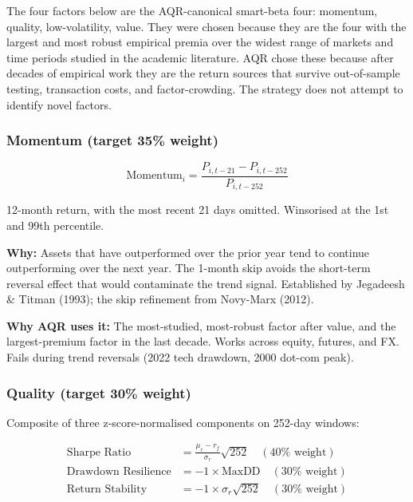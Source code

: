 \documentclass[11pt,a4paper]{article}
\begin{document}
The four factors below are the AQR-canonical smart-beta four: momentum, quality, low-volatility, value. They were chosen because they are the four with the largest and most robust empirical premia over the widest range of markets and time periods studied in the academic literature. AQR chose these because after decades of empirical work they are the return sources that survive out-of-sample testing, transaction costs, and factor-crowding. The strategy does not attempt to identify novel factors.

\subsubsection{Momentum (target 35\% weight)}

\begin{equation}
\text{Momentum}_i = \frac{P_{i,t-21} - P_{i,t-252}}{P_{i,t-252}}
\end{equation}

12-month return, with the most recent 21 days omitted. Winsorised at the 1st and 99th percentile.

\textbf{Why:} Assets that have outperformed over the prior year tend to continue outperforming over the next year. The 1-month skip avoids the short-term reversal effect that would contaminate the trend signal. Established by Jegadeesh \& Titman (1993); the skip refinement from Novy-Marx (2012).

\textbf{Why AQR uses it:} The most-studied, most-robust factor after value, and the largest-premium factor in the last decade. Works across equity, futures, and FX. Fails during trend reversals (2022 tech drawdown, 2000 dot-com peak).

\subsubsection{Quality (target 30\% weight)}

Composite of three z-score-normalised components on 252-day windows:

\begin{align}
\text{Sharpe Ratio} &= \frac{\mu_r - r_f}{\sigma_r} \sqrt{252} \quad (40\% \text{ weight}) \\
\text{Drawdown Resilience} &= -1 \times \text{MaxDD} \quad (30\% \text{ weight}) \\
\text{Return Stability} &= -1 \times \sigma_r \sqrt{252} \quad (30\% \text{ weight})
\end{align}
\end{document}
